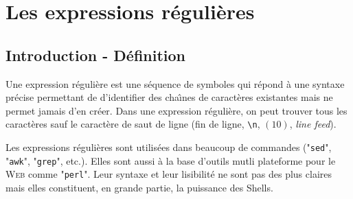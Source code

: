 %
%

\setcounter{remarque-cnt}{1}
\setcounter{example-cnt}{1}
\chapter{\label{reg-exp}Les expressions r{\'e}guli{\`e}res}
\thispagestyle{fancy}

\section{Introduction - D{\'e}finition}

Une expression r{\'e}guli{\`e}re est
une s{\'e}quence de symboles qui r{\'e}pond {\`a} une syntaxe
pr{\'e}cise permettant de d'identifier des cha{\^\i}nes de
caract{\`e}res existantes mais ne permet jamais d'en cr{\'e}er. Dans une
expression r{\'e}guli{\`e}re, on peut trouver tous les caract{\`e}res
sauf le caract{\`e}re de saut de ligne (fin de ligne, \verb=\n=,
{\ASCII}$(10)$, \textsl{line feed}).

Les expressions r{\'e}guli{\`e}res sont utilis{\'e}es dans beaucoup de commandes
{\Unix} ("\texttt{sed}",
"\texttt{awk}", "\texttt{grep}",
etc.). Elles sont aussi {\`a} la base d'outils mutli plateforme pour le \textsc{Web}
comme "\texttt{perl}"\cite{learning-perl,programming-perl,advpgm-perl}.
Leur syntaxe et leur lisibilit{\'e} ne sont pas des plus claires mais elles
constituent, en grande partie, la puissance des Shells.


